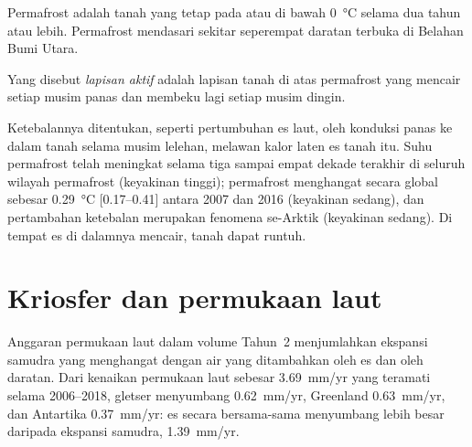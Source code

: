 Permafrost adalah tanah yang tetap pada atau di bawah \qty{0}{\celsius} selama dua
tahun atau lebih. Permafrost mendasari sekitar seperempat daratan terbuka di Belahan Bumi
Utara.

\begin{definition}\label{def:b3:glaciology:permafrost}
Yang disebut \emph{lapisan aktif} adalah lapisan tanah di atas
permafrost yang mencair setiap musim panas dan membeku lagi setiap musim dingin.
\end{definition}

Ketebalannya ditentukan, seperti pertumbuhan es laut, oleh konduksi panas ke
dalam tanah selama musim lelehan, melawan kalor laten
es tanah itu. Suhu permafrost telah meningkat selama tiga sampai
empat dekade terakhir di seluruh wilayah permafrost (keyakinan tinggi);
permafrost menghangat secara global sebesar \qty{0.29}{\celsius} [\numrange{0.17}{0.41}]
antara 2007 dan 2016 (keyakinan sedang), dan pertambahan ketebalan
 merupakan fenomena se-Arktik (keyakinan sedang).
Di tempat es di dalamnya mencair, tanah dapat runtuh.

\section{Kriosfer dan permukaan laut}\label{sec:b3:glaciology:sea-level}

Anggaran permukaan laut dalam volume Tahun~2 menjumlahkan ekspansi samudra yang
menghangat dengan air yang ditambahkan oleh es dan oleh daratan. Dari
kenaikan permukaan laut sebesar \qty{3.69}{mm/yr} yang teramati selama 2006--2018, gletser
menyumbang \qty{0.62}{mm/yr}, Greenland \qty{0.63}{mm/yr}, dan Antartika
\qty{0.37}{mm/yr}: es secara bersama-sama menyumbang lebih besar daripada ekspansi
samudra, \qty{1.39}{mm/yr}.


